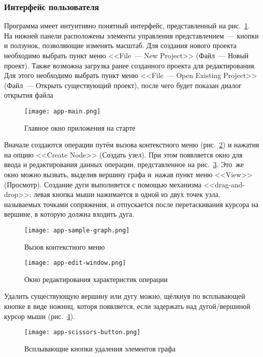 \subsubsection*{Интерфейс пользователя}
Программа имеет интуитивно понятный интерфейс, представленный на рис.~\ref{fig:app-main}. На нижней панели расположены элементы управления представлением~--- кнопки и ползунок, позволяющие изменять масштаб. Для создания нового проекта необходимо выбрать пункт меню <<File~--- New Project>> (Файл~--- Новый проект). Также возможна загрузка ранее созданного проекта для редактирования. Для этого необходимо выбрать пункт меню <<File~--- Open Existing Project>> (Файл~--- Открыть существующий проект), после чего будет показан диалог открытия файла 
\begin{figure}[h!]
  \centering
  {
    \texttt{[image: app-main.png]}
  }
  \caption{Главное окно приложения на старте}
  \label{fig:app-main}
\end{figure}

Вначале создаются операции путём вызова контекстного меню (рис.~\ref{fig:app-sample-graph}) и нажатия на опцию <<Create Node>> (Создать узел). При этом появляется окно для ввода и редактирования данных операции, представленное на рис.~\ref{fig:app-edit-window}. Это~же окно можно вызвать, выделив вершину графа и~нажав пункт меню <<View>> (Просмотр). Создание дуги выполняется с помощью механизма <<drag-and-drop>>: левая кнопка мыши нажимается в одной из двух точек узла, называемых точками сопряжения, и отпускается после перетаскивания курсора на вершине, в которую должна входить дуга. 

\begin{figure}[b!]
  \centering
  {
    \texttt{[image: app-sample-graph.png]}
  }
  \caption{Вызов контекстного меню}
  \label{fig:app-sample-graph}
\end{figure}

\begin{figure}[h!]
  \centering
  {
    \texttt{[image: app-edit-window.png]}
  }
  \caption{Окно редактирования характеристик операции}
  \label{fig:app-edit-window}
\end{figure}

Удалить существующую вершину или дугу можно, щёлкнув по всплывающей кнопке в виде ножниц, которя появляется, если задержать над дугой/вершиной курсор мыши (рис.~\ref{fig:app-scissors-button}). 
\begin{figure}[h!]
  \centering
  {
    \texttt{[image: app-scissors-button.png]}
  }
  \caption{Всплывающие кнопки удаления элементов графа}
  \label{fig:app-scissors-button}
\end{figure}


